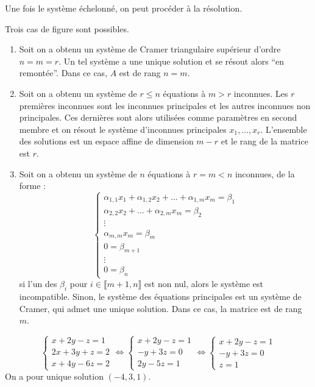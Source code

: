   Une fois le système échelonné, on peut procéder à la résolution.

  \begin{theorem}
    Trois cas de figure sont possibles.
    \begin{enumerate}[label={\bfseries(\roman*)}]
      \item Soit on a obtenu un système de Cramer triangulaire supérieur d'ordre $n = m = r$. Un tel système a une unique solution et se résout alors ``en remontée''. Dans ce cas, $A$ est de rang $n = m$.
      \item Soit on a obtenu un système de $r \leq n$ équations à $m > r$ inconnues. Les $r$ premières inconnues sont les inconnues principales et les autres inconnues non principales. Ces dernières sont alors utilisées comme paramètres en second membre et on résout le système d'inconnues principales $x_1, \dots, x_r$. L'ensemble des solutions est un espace affine de dimension $m-r$ et le rang de la matrice est $r$.
      \item Soit on a obtenu un système de $n$ équations à $r = m < n$ inconnues, de la forme :
      \[
      \begin{cases}
        \alpha_{1,1} x_1 + \alpha_{1,2} x_2 + \dots + \alpha_{1,m} x_m = \beta_1 \\
        \alpha_{2,2} x_2 + \dots + \alpha_{2,m} x_m = \beta_2 \\
        \vdots \\
        \alpha_{m,m} x_m = \beta_m \\
        0 = \beta_{m+1} \\
        \vdots \\
        0 = \beta_n
      \end{cases}
      \]
      si l'un des $\beta_i$ pour $i \in \llbracket m+1, n \rrbracket$ est non nul, alors le système est incompatible. Sinon, le système des équations principales est un système de Cramer, qui admet une unique solution. Dans ce cas, la matrice est de rang $m$.
    \end{enumerate}
  \end{theorem}


  \begin{example}
    \[
      \begin{cases}
        x + 2y - z = 1 \\
        2x + 3y + z = 2 \\
        x + 4y - 6z = 2
      \end{cases}
      \iff
      \begin{cases}
        x + 2y - z = 1 \\
        -y + 3z = 0 \\
        2y - 5z = 1
      \end{cases}
      \iff
      \begin{cases}
        x + 2y - z = 1 \\
        -y + 3z = 0 \\
        z = 1
      \end{cases}
    \]
    On a pour unique solution $(-4,3,1)$.
  \end{example}

